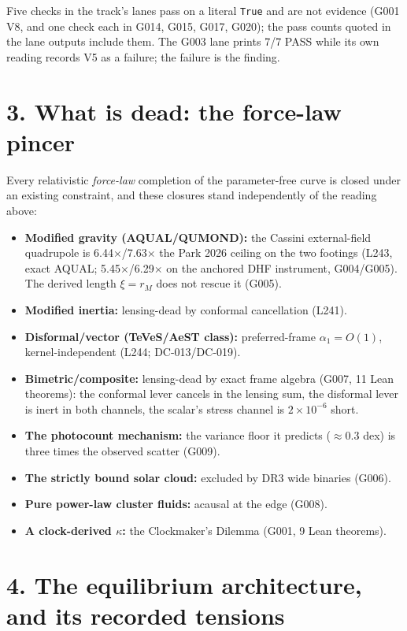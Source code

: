\documentclass[
  11pt,
]{article}
\providecommand{\tightlist}{%
  \setlength{\itemsep}{0pt}\setlength{\parskip}{0pt}}
\begin{document}
Five checks in the track's lanes pass on a literal \texttt{True} and are
not evidence (G001 V8, and one check each in G014, G015, G017, G020);
the pass counts quoted in the lane outputs include them. The G003 lane
prints 7/7 PASS while its own reading records V5 as a failure; the
failure is the finding.

\section{3. What is dead: the force-law
pincer}\label{what-is-dead-the-force-law-pincer}

Every relativistic \emph{force-law} completion of the parameter-free
curve is closed under an existing constraint, and these closures stand
independently of the reading above:

\begin{itemize}
\tightlist
\item
  \textbf{Modified gravity (AQUAL/QUMOND):} the Cassini external-field
  quadrupole is 6.44\(\times\)/7.63\(\times\) the Park 2026 ceiling on
  the two footings (L243, exact AQUAL; 5.45\(\times\)/6.29\(\times\) on
  the anchored DHF instrument, G004/G005). The derived length
  \(\xi = r_M\) does not rescue it (G005).
\item
  \textbf{Modified inertia:} lensing-dead by conformal cancellation
  (L241).
\item
  \textbf{Disformal/vector (TeVeS/AeST class):} preferred-frame
  \(\alpha_1 = O(1)\), kernel-independent (L244; DC-013/DC-019).
\item
  \textbf{Bimetric/composite:} lensing-dead by exact frame algebra
  (G007, 11 Lean theorems): the conformal lever cancels in the lensing
  sum, the disformal lever is inert in both channels, the scalar's
  stress channel is \(2 \times 10^{-6}\) short.
\item
  \textbf{The photocount mechanism:} the variance floor it predicts
  (\(\approx 0.3\) dex) is three times the observed scatter (G009).
\item
  \textbf{The strictly bound solar cloud:} excluded by DR3 wide binaries
  (G006).
\item
  \textbf{Pure power-law cluster fluids:} acausal at the edge (G008).
\item
  \textbf{A clock-derived \(\kappa\):} the Clockmaker's Dilemma (G001, 9
  Lean theorems).
\end{itemize}

\section{4. The equilibrium architecture, and its recorded
tensions}\label{the-equilibrium-architecture-and-its-recorded-tensions}
\end{document}
